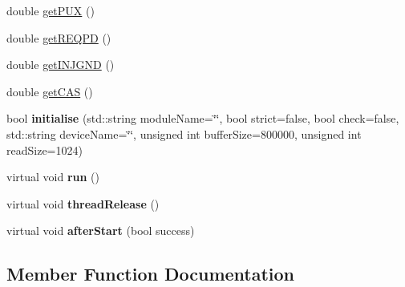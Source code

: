 \begin{DoxyCompactItemize}
\item 
double \hyperlink{classdevice2yarp_a17cabe5685326832b143a95bc079fce2}{get\+P\+UX} ()
\item 
double \hyperlink{classdevice2yarp_ad9668df280f370362a6be3d020766b53}{get\+R\+E\+Q\+PD} ()
\item 
double \hyperlink{classdevice2yarp_a71d866e65c1a1da500cde870fc9a4202}{get\+I\+N\+J\+G\+ND} ()
\item 
double \hyperlink{classdevice2yarp_a2695a28ec3a0864fd1f16bf58b757338}{get\+C\+AS} ()
\item 
bool {\bfseries initialise} (std\+::string module\+Name=\char`\"{}\char`\"{}, bool strict=false, bool check=false, std\+::string device\+Name=\char`\"{}\char`\"{}, unsigned int buffer\+Size=800000, unsigned int read\+Size=1024)\hypertarget{classdevice2yarp_ab94cdfb71b80d35005b43d42276266e1}{}\label{classdevice2yarp_ab94cdfb71b80d35005b43d42276266e1}

\item 
virtual void {\bfseries run} ()\hypertarget{classdevice2yarp_a2edb15ab91293f60b5ba2426ae247e1e}{}\label{classdevice2yarp_a2edb15ab91293f60b5ba2426ae247e1e}

\item 
virtual void {\bfseries thread\+Release} ()\hypertarget{classdevice2yarp_a684963ad891d4dc4e19c5128c88bfff0}{}\label{classdevice2yarp_a684963ad891d4dc4e19c5128c88bfff0}

\item 
virtual void {\bfseries after\+Start} (bool success)\hypertarget{classdevice2yarp_a1098424f146070180d0681787b771451}{}\label{classdevice2yarp_a1098424f146070180d0681787b771451}

\end{DoxyCompactItemize}


\subsection{Member Function Documentation}
